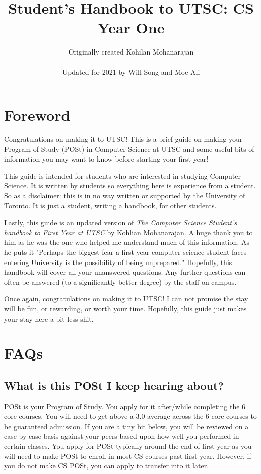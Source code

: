 \documentclass[11pt]{article}
\title{Student's Handbook to UTSC: CS Year One}
\author{Originally created Kohilan Mohanarajan \\ \\ Updated for 2021 by Will Song and Moe Ali}
\begin{document}
\maketitle
\newpage
\tableofcontents
\newpage
\section{Foreword}

Congratulations on making it to UTSC! This is a brief guide on making your Program of Study (POSt) in Computer Science at UTSC and some useful bits of information you may want to know before starting your first year!\par
This guide is intended for students who are interested in studying Computer Science. It is written by students so everything here is experience from a student. So as a disclaimer: this is in no way written or supported by the University of Toronto. It is just a student, writing a handbook, for other students. \par
Lastly, this guide is an updated version of \textit{The Computer Science Student's handbook to First Year at UTSC} by Kohlian Mohanarajan. A huge thank you to him as he was the one who helped me understand much of this information. As he puts it "Perhaps the biggest fear a first-year computer science student faces entering University is the possibility of being unprepared." Hopefully, this handbook will cover all your unanswered questions. Any further questions can often be answered (to a significantly better degree) by the staff on campus.\par
Once again, congratulations on making it to UTSC! I can not promise the stay will be fun, or rewarding, or worth your time. Hopefully, this guide just makes your stay here a bit less shit.

\section{FAQs}
\subsection{What is this POSt I keep hearing about?} POSt is your Program of Study. You apply for it after/while completing the 6 core courses. You will need to get above a 3.0 average across the 6 core courses to be guaranteed admission. If you are a tiny bit below, you will be reviewed on a case-by-case basis against your peers based upon how well you performed in certain classes. You apply for POSt typically around the end of first year as you will need to make POSt to enroll in most CS courses past first year. However, if you do not make CS POSt, you can apply to transfer into it later.\par
\end{document}
